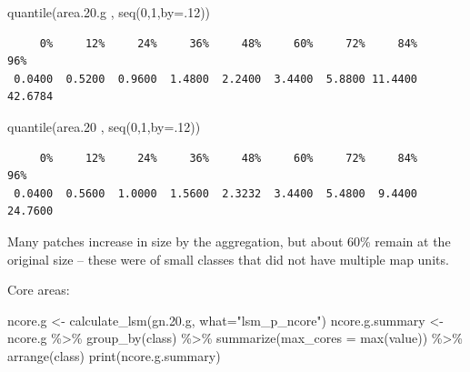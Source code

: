 \documentclass[
  letterpaper,
  DIV=11,
  numbers=noendperiod]{scrartcl}
\newenvironment{Shaded}{\begin{snugshade}}{\end{snugshade}}
\newcommand{\AttributeTok}[1]{\textcolor[rgb]{0.40,0.45,0.13}{#1}}
\newcommand{\DecValTok}[1]{\textcolor[rgb]{0.68,0.00,0.00}{#1}}
\newcommand{\FloatTok}[1]{\textcolor[rgb]{0.68,0.00,0.00}{#1}}
\newcommand{\FunctionTok}[1]{\textcolor[rgb]{0.28,0.35,0.67}{#1}}
\newcommand{\NormalTok}[1]{\textcolor[rgb]{0.00,0.23,0.31}{#1}}
\newcommand{\OtherTok}[1]{\textcolor[rgb]{0.00,0.23,0.31}{#1}}
\newcommand{\SpecialCharTok}[1]{\textcolor[rgb]{0.37,0.37,0.37}{#1}}
\newcommand{\StringTok}[1]{\textcolor[rgb]{0.13,0.47,0.30}{#1}}
\begin{document}
\begin{Shaded}
\begin{Highlighting}[]
\FunctionTok{quantile}\NormalTok{(area.}\FloatTok{20.}\NormalTok{g , }\FunctionTok{seq}\NormalTok{(}\DecValTok{0}\NormalTok{,}\DecValTok{1}\NormalTok{,}\AttributeTok{by=}\NormalTok{.}\DecValTok{12}\NormalTok{))}
\end{Highlighting}
\end{Shaded}

\begin{verbatim}
     0%     12%     24%     36%     48%     60%     72%     84%     96% 
 0.0400  0.5200  0.9600  1.4800  2.2400  3.4400  5.8800 11.4400 42.6784 
\end{verbatim}

\begin{Shaded}
\begin{Highlighting}[]
\FunctionTok{quantile}\NormalTok{(area}\FloatTok{.20}\NormalTok{ , }\FunctionTok{seq}\NormalTok{(}\DecValTok{0}\NormalTok{,}\DecValTok{1}\NormalTok{,}\AttributeTok{by=}\NormalTok{.}\DecValTok{12}\NormalTok{))}
\end{Highlighting}
\end{Shaded}

\begin{verbatim}
     0%     12%     24%     36%     48%     60%     72%     84%     96% 
 0.0400  0.5600  1.0000  1.5600  2.3232  3.4400  5.4800  9.4400 24.7600 
\end{verbatim}

Many patches increase in size by the aggregation, but about 60\% remain
at the original size -- these were of small classes that did not have
multiple map units.

Core areas:

\begin{Shaded}
\begin{Highlighting}[]
\NormalTok{ncore.g }\OtherTok{\textless{}{-}} \FunctionTok{calculate\_lsm}\NormalTok{(gn.}\FloatTok{20.}\NormalTok{g, }\AttributeTok{what=}\StringTok{"lsm\_p\_ncore"}\NormalTok{)}
\NormalTok{ncore.g.summary }\OtherTok{\textless{}{-}}\NormalTok{ ncore.g }\SpecialCharTok{\%\textgreater{}\%} \FunctionTok{group\_by}\NormalTok{(class) }\SpecialCharTok{\%\textgreater{}\%}
  \FunctionTok{summarize}\NormalTok{(}\AttributeTok{max\_cores =} \FunctionTok{max}\NormalTok{(value)) }\SpecialCharTok{\%\textgreater{}\%}
  \FunctionTok{arrange}\NormalTok{(class)}
\FunctionTok{print}\NormalTok{(ncore.g.summary)}
\end{Highlighting}
\end{Shaded}
\end{document}
